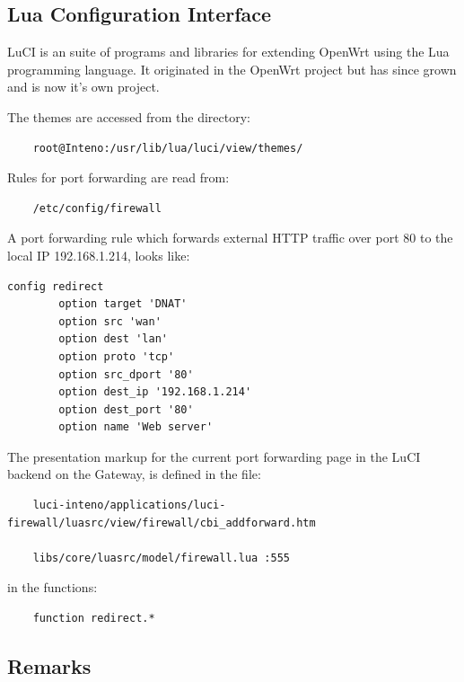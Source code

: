 \documentclass[a4paper,11pt]{kth-mag}
\begin{document}
\subsection{Lua Configuration Interface}
LuCI is an suite of programs and libraries for extending OpenWrt using the Lua programming language.
It originated in the OpenWrt project but has since grown and is now it's own project.

The themes are accessed from the directory:

\begin{verbatim}
    root@Inteno:/usr/lib/lua/luci/view/themes/
\end{verbatim}

Rules for port forwarding are read from:

\begin{verbatim}
    /etc/config/firewall
\end{verbatim}

A port forwarding rule which forwards external HTTP traffic over port 80 to the local IP 192.168.1.214, looks like:

\begin{verbatim}
config redirect               
        option target 'DNAT' 
        option src 'wan'
        option dest 'lan'
        option proto 'tcp'
        option src_dport '80'
        option dest_ip '192.168.1.214'
        option dest_port '80' 
        option name 'Web server'
\end{verbatim}

The presentation markup for the current port forwarding page in the LuCI backend on the Gateway, is defined in the file:

\begin{verbatim}
    luci-inteno/applications/luci-firewall/luasrc/view/firewall/cbi_addforward.htm

    libs/core/luasrc/model/firewall.lua :555
\end{verbatim}

in the functions:

\begin{verbatim}
    function redirect.*
\end{verbatim}

\subsection{Remarks}
\end{document}
